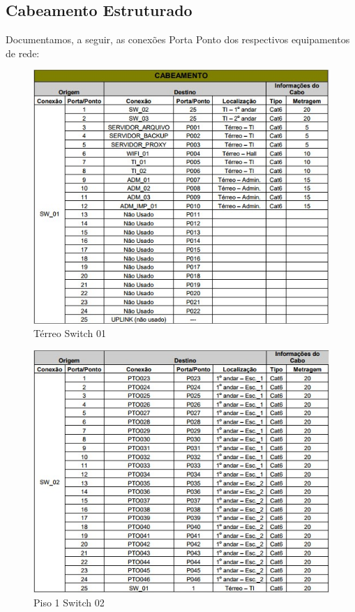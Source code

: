 \documentclass[	DIV=calc,%
							paper=a4,%
							fontsize=12pt,%
							onecolumn]{scrartcl}	 					%
\begin{document}
\subsection{Cabeamento Estruturado}
{\raggedright Documentamos, a seguir, as conexões Porta Ponto dos respectivos equipamentos de rede:
}
\begin{figure}[H]
  \centering
  \includegraphics[width=\textwidth]{sw-01} 
  \caption{Térreo Switch 01}
  \label{fig:methodology}
\end{figure}
\begin{figure}[H]
  \centering
  \includegraphics[width=\textwidth]{sw-02} 
  \caption{Piso 1 Switch 02}
  \label{fig:methodology}
\end{figure}
\end{document}
